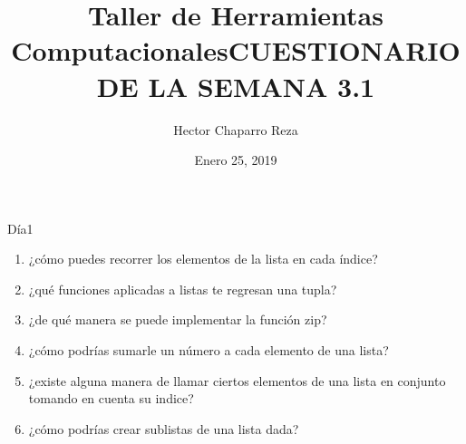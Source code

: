 \documentclass[letterpaper, 12pt, oneside]{article}
\title{\Huge{Taller de Herramientas Computacionales}}
\author{Hector Chaparro Reza}
\date{Enero 25, 2019}
\begin{document}
	\title{\Huge{CUESTIONARIO DE LA SEMANA 3.1}}	
	Día1
	\begin{enumerate}
		\item ¿cómo puedes recorrer los elementos de la lista en cada índice?
		\item ¿qué funciones aplicadas a listas te regresan una tupla?
		\item ¿de qué manera se puede implementar la función zip?
		\item ¿cómo podrías sumarle un número a cada elemento de una lista?
		\item ¿existe alguna manera de llamar ciertos elementos de una lista en conjunto tomando en cuenta su indice?
		\item ¿cómo podrías crear sublistas de una lista dada?
	\end{enumerate}
\end{document}
